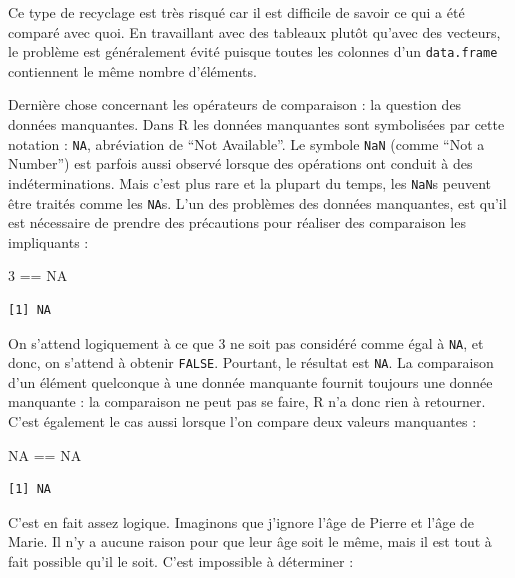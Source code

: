 \documentclass[a4paperpaper,]{article}
\newenvironment{Shaded}{\begin{snugshade}}{\end{snugshade}}
\newcommand{\DecValTok}[1]{\textcolor[rgb]{0.69,0.50,0.00}{#1}}
\newcommand{\OperatorTok}[1]{\textcolor[rgb]{0.12,0.11,0.11}{#1}}
\newcommand{\OtherTok}[1]{\textcolor[rgb]{0.00,0.43,0.16}{#1}}
\newcommand{\StringTok}[1]{\textcolor[rgb]{0.75,0.01,0.01}{#1}}
\theoremstyle{definition}
\theoremstyle{definition}
\theoremstyle{definition}
\theoremstyle{remark}
\begin{document}
Ce type de recyclage est très risqué car il est difficile de savoir ce
qui a été comparé avec quoi. En travaillant avec des tableaux plutôt
qu'avec des vecteurs, le problème est généralement évité puisque toutes
les colonnes d'un \texttt{data.frame} contiennent le même nombre
d'éléments.

Dernière chose concernant les opérateurs de comparaison : la question
des données manquantes. Dans R les données manquantes sont symbolisées
par cette notation : \texttt{NA}, abréviation de ``Not Available''. Le
symbole \texttt{NaN} (comme ``Not a Number'') est parfois aussi observé
lorsque des opérations ont conduit à des indéterminations. Mais c'est
plus rare et la plupart du temps, les \texttt{NaN}s peuvent être traités
comme les \texttt{NA}s. L'un des problèmes des données manquantes, est
qu'il est nécessaire de prendre des précautions pour réaliser des
comparaison les impliquants :

\begin{Shaded}
\begin{Highlighting}[]
\DecValTok{3} \OperatorTok{==}\StringTok{ }\OtherTok{NA}
\end{Highlighting}
\end{Shaded}

\begin{verbatim}
[1] NA
\end{verbatim}

On s'attend logiquement à ce que 3 ne soit pas considéré comme égal à
\texttt{NA}, et donc, on s'attend à obtenir \texttt{FALSE}. Pourtant, le
résultat est \texttt{NA}. La comparaison d'un élément quelconque à une
donnée manquante fournit toujours une donnée manquante : la comparaison
ne peut pas se faire, R n'a donc rien à retourner. C'est également le
cas aussi lorsque l'on compare deux valeurs manquantes :

\begin{Shaded}
\begin{Highlighting}[]
\OtherTok{NA} \OperatorTok{==}\StringTok{ }\OtherTok{NA}
\end{Highlighting}
\end{Shaded}

\begin{verbatim}
[1] NA
\end{verbatim}

C'est en fait assez logique. Imaginons que j'ignore l'âge de Pierre et
l'âge de Marie. Il n'y a aucune raison pour que leur âge soit le même,
mais il est tout à fait possible qu'il le soit. C'est impossible à
déterminer :
\end{document}

